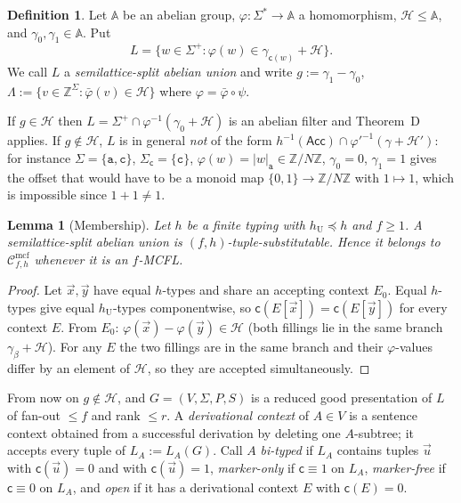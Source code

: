 \documentclass[11pt]{article}
\newtheorem{lemma}[theorem]{Lemma}
\theoremstyle{definition}
\newtheorem{definition}[theorem]{Definition}
\theoremstyle{remark}
\newcommand{\Cmcf}[2]{\mathcal{C}^{\mathrm{mcf}}_{#1,#2}}
\newcommand{\tuple}[1]{\vec{#1}}
\newcommand{\Z}{\mathbb Z}
\newcommand{\mk}{\mathsf c}
\begin{document}
\begin{definition}\label{def:split}
Let $\mathbb A$ be an abelian group, $\varphi:\Sigma^*\to\mathbb A$ a
homomorphism, $\mathcal H\le\mathbb A$, and $\gamma_0,\gamma_1\in\mathbb A$.
Put
\[
L=\{w\in\Sigma^+:\varphi(w)\in\gamma_{\mk(w)}+\mathcal H\}.
\]
We call $L$ a \emph{semilattice-split abelian union} and write
$g:=\gamma_1-\gamma_0$, $\Lambda:=\{v\in\Z^\Sigma:\bar\varphi(v)\in\mathcal
H\}$ where $\varphi=\bar\varphi\circ\psi$.
\end{definition}

If $g\in\mathcal H$ then $L=\Sigma^+\cap\varphi^{-1}(\gamma_0+\mathcal H)$
is an abelian filter and Theorem~D applies.  If $g\notin\mathcal H$, $L$ is
in general \emph{not} of the form
$h^{-1}(\mathsf{Acc})\cap\varphi'^{-1}(\gamma+\mathcal H')$: for instance
$\Sigma=\{\mathtt a,\mathtt c\}$, $\Sigma_{\mk}=\{\mathtt c\}$,
$\varphi(w)=|w|_{\mathtt a}\in\Z/N\Z$, $\gamma_0=0$, $\gamma_1=1$ gives the
offset that would have to be a monoid map
$\{0,1\}\to\Z/N\Z$ with $1\mapsto1$, which is impossible since $1+1\ne1$.

\begin{lemma}[Membership]\label{lem:split-member}
Let $h$ be a finite typing with $h_{\mathrm U}\preceq h$ and $f\ge1$.  A
semilattice-split abelian union is $(f,h)$-tuple-substitutable.  Hence it
belongs to $\Cmcf{f}{h}$ whenever it is an $f$-MCFL.
\end{lemma}
\begin{proof}
Let $\tuple x,\tuple y$ have equal $h$-types and share an accepting context
$E_0$.  Equal $h$-types give equal $h_{\mathrm U}$-types componentwise, so
$\mk(E[\tuple x])=\mk(E[\tuple y])$ for every context $E$.  From $E_0$:
$\varphi(\tuple x)-\varphi(\tuple y)\in\mathcal H$ (both fillings lie in the
same branch $\gamma_\beta+\mathcal H$).  For any $E$ the two fillings are in
the same branch and their $\varphi$-values differ by an element of
$\mathcal H$, so they are accepted simultaneously.
\end{proof}

From now on $g\notin\mathcal H$, and $G=(V,\Sigma,P,S)$ is a reduced good
presentation of $L$ of fan-out $\le f$ and rank $\le r$.  A
\emph{derivational context} of $A\in V$ is a sentence context obtained from
a successful derivation by deleting one $A$-subtree; it accepts every tuple
of $L_A:=L_A(G)$.  Call $A$ \emph{bi-typed} if $L_A$ contains tuples
$\tuple u$ with $\mk(\tuple u)=0$ and with $\mk(\tuple u)=1$,
\emph{marker-only} if $\mk\equiv1$ on $L_A$, \emph{marker-free} if
$\mk\equiv0$ on $L_A$, and \emph{open} if it has a derivational context $E$
with $\mk(E)=0$.
\end{document}
